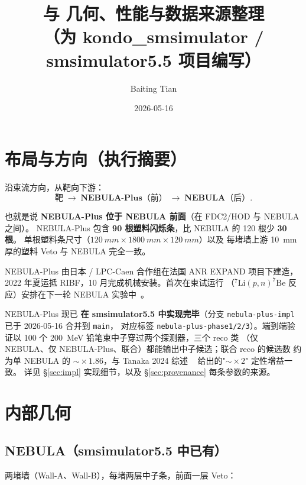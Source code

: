 \documentclass[a4paper,11pt]{ctexart}
\title{\NEB{} 与 \NPL{} 几何、性能与数据来源整理\\
       \large （为 kondo\_smsimulator / smsimulator5.5 项目编写）}
\author{Baiting Tian}
\date{2026-05-16}
\newcommand{\NEB}{NEBULA}
\newcommand{\NPL}{NEBULA-Plus}
\begin{document}
\maketitle

\section{布局与方向（执行摘要）}

沿束流方向，从靶向下游：
\[
\text{靶} \;\longrightarrow\;
\textbf{\NPL{}（前）} \;\longrightarrow\; \textbf{\NEB{}（后）}.
\]

也就是说 \textbf{\NPL{} 位于 \NEB{} 前面}（在 FDC2/HOD 与 \NEB{} 之间）。
\NPL{} 包含 \textbf{90 根塑料闪烁条}，比 \NEB{} 的 120 根少 \textbf{30 根}。
单根塑料条尺寸（$\SI{120}{mm}\times\SI{1800}{mm}\times\SI{120}{mm}$）以及
每堵墙上游 \SI{10}{mm} 厚的塑料 Veto 与 \NEB{} 完全一致。

\NPL{} 由日本 / LPC-Caen 合作组在法国 ANR EXPAND 项目下建造，
2022 年夏运抵 RIBF，10 月完成机械安装。首次在束试运行
（$^{7}\mathrm{Li}(p,n)^{7}\mathrm{Be}$ 反应）安排在下一轮 \NEB{}
实验中~\cite{aprApr2022}。

\NPL{} 现已 \textbf{在 smsimulator5.5 中实现完毕}（分支
\texttt{nebula-plus-impl} 已于 2026-05-16 合并到 \texttt{main}，
对应标签 \texttt{nebula-plus-phase1/2/3}）。端到端验证以
100 个 \SI{200}{MeV} 铅笔束中子穿过两个探测器，三个 reco 类
（仅 \NEB{}、仅 \NPL{}、联合）都能输出中子候选；联合 reco 的候选数
约为单 \NEB{} 的 $\sim\!\!\times 1.86$，与 Tanaka 2024 综述
~\cite{tanaka2024} 给出的"$\sim\!\!\times 2$" 定性增益一致。
详见 \S\ref{sec:impl} 实现细节，以及 \S\ref{sec:provenance}
每条参数的来源。

\section{内部几何}

\subsection{\NEB{}（smsimulator5.5 中已有）}

两堵墙（Wall-A、Wall-B），每堵两层中子条，前面一层 Veto：
\end{document}
